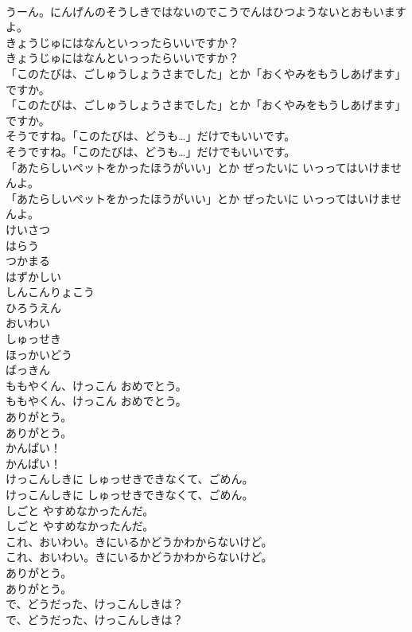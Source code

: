 \documentclass[8pt]{extreport}
\begin{document}
\begin{CJK}{UTF8}{min}
\\	うーん。にんげんのそうしきではないのでこうでんはひつようないとおもいますよ。
\\	きょうじゅにはなんといっったらいいですか？
\\	きょうじゅにはなんといっったらいいですか？
\\	「このたびは、ごしゅうしょうさまでした」とか「おくやみをもうしあげます」ですか。
\\	「このたびは、ごしゅうしょうさまでした」とか「おくやみをもうしあげます」ですか。
\\	そうですね。「このたびは、どうも…」だけでもいいです。
\\	そうですね。「このたびは、どうも…」だけでもいいです。
\\	「あたらしいペットをかったほうがいい」とか ぜったいに いっってはいけませんよ。
\\	「あたらしいペットをかったほうがいい」とか ぜったいに いっってはいけませんよ。
\\	けいさつ
\\	はらう
\\	つかまる
\\	はずかしい
\\	しんこんりょこう
\\	ひろうえん
\\	おいわい
\\	しゅっせき
\\	ほっかいどう
\\	ばっきん
\\	ももやくん、けっこん おめでとう。
\\	ももやくん、けっこん おめでとう。
\\	ありがとう。
\\	ありがとう。
\\	かんぱい！
\\	かんぱい！
\\	けっこんしきに しゅっせきできなくて、ごめん。
\\	けっこんしきに しゅっせきできなくて、ごめん。
\\	しごと やすめなかったんだ。
\\	しごと やすめなかったんだ。
\\	これ、おいわい。きにいるかどうかわからないけど。
\\	これ、おいわい。きにいるかどうかわからないけど。
\\	ありがとう。
\\	ありがとう。
\\	で、どうだった、けっこんしきは？
\\	で、どうだった、けっこんしきは？

\end{CJK}
\end{document}
